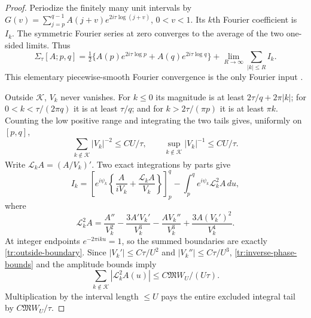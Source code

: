 \documentclass[11pt]{article}
\numberwithin{equation}{section}
\theoremstyle{definition}
\theoremstyle{remark}
\begin{document}
\begin{proof}
Periodize the finitely many unit intervals by
$G(v)=\sum_{j=p}^{q-1}A(j+v)e^{2i\tau\log(j+v)}$, $0<v<1$.
Its $k$th Fourier coefficient is $I_k$.  The symmetric Fourier series
at zero converges to the average of the two one-sided limits.  Thus
\begin{equation}
\label{tr:finite-poisson}
 \Sigma_\tau[A;p,q]=
 \tfrac12\{A(p)e^{2i\tau\log p}+A(q)e^{2i\tau\log q}\}
 +\lim_{R\to\infty}\sum_{|k|\le R}I_k.
\end{equation}
This elementary piecewise-smooth Fourier convergence is the only
Fourier input \cite{dlmffourier}.

Outside $\mathcal K$, $V_k$ never vanishes.  For $k\le0$ its
magnitude is at least $2\tau/q+2\pi|k|$; for
$0<k<\tau/(2\pi q)$ it is at least $\tau/q$; and for
$k>2\tau/(\pi p)$ it is at least $\pi k$.  Counting the low positive
range and integrating the two tails gives, uniformly on $[p,q]$,
\begin{equation}
\label{tr:inverse-phase-bounds}
 \sum_{k\notin\mathcal K}|V_k|^{-2}\le CU/\tau,
 \qquad \sup_{k\notin\mathcal K}|V_k|^{-1}\le CU/\tau.
\end{equation}
Write $\mathcal L_kA=(A/V_k)'$.  Two exact integrations by parts give
\[
 I_k=\left[e^{i\psi_k}
       \left\{\frac A{iV_k}+\frac{\mathcal L_kA}{V_k}\right\}
       \right]_p^q
       -\int_p^qe^{i\psi_k}\mathcal L_k^2A\,du,
\]
where
\[
 \mathcal L_k^2A=
 \frac{A''}{V_k^2}-\frac{3A'V_k'}{V_k^3}
 -\frac{AV_k''}{V_k^3}+\frac{3A(V_k')^2}{V_k^4}.
\]
At integer endpoints $e^{-2\pi iku}=1$, so the summed boundaries are
exactly \eqref{tr:outside-boundary}.  Since
$|V_k'|\le C\tau/U^2$ and $|V_k''|\le C\tau/U^3$,
\eqref{tr:inverse-phase-bounds} and the amplitude bounds imply
\[
 \sum_{k\notin\mathcal K}|\mathcal L_k^2A(u)|
 \le C\mathfrak M W_U/(U\tau).
\]
Multiplication by the interval length $\le U$ pays the entire excluded
integral tail by $C\mathfrak M W_U/\tau$.


\end{proof}
\end{document}
